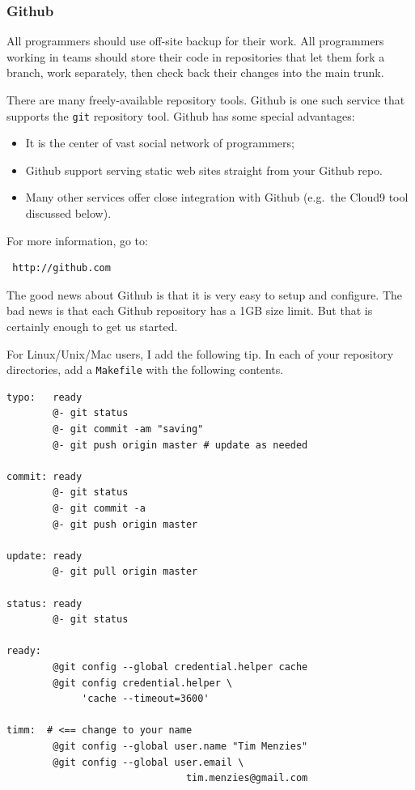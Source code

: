 \subsubsection{Github}\label{github}

All programmers should use off-site backup for their work. All
programmers working in teams should store their code in repositories
that let them fork a branch, work separately, then check back their
changes into the main trunk.

There are many freely-available repository tools. Github is one such
service that supports the \texttt{git} repository tool. Github has some
special advantages:

\begin{itemize}
\itemsep1pt\parskip0pt
\item
  It is the center of vast social network of programmers;
\item
  Github support serving static web sites straight from your Github
  repo.
\item
  Many other services offer close integration with Github (e.g.~the
  Cloud9 tool discussed below).
\end{itemize}

For more information, go to:

\begin{lstlisting}
 http://github.com
\end{lstlisting}

The good news about Github is that it is very easy to setup and
configure. The bad news is that each Github repository has a 1GB size
limit. But that is certainly enough to get us started.

For Linux/Unix/Mac users, I add the following tip. In each of your
repository directories, add a \texttt{Makefile} with the following
contents.

\begin{lstlisting}
typo:   ready
        @- git status
        @- git commit -am "saving"
        @- git push origin master # update as needed

commit: ready
        @- git status
        @- git commit -a
        @- git push origin master

update: ready
        @- git pull origin master

status: ready
        @- git status

ready:
        @git config --global credential.helper cache
        @git config credential.helper \
             'cache --timeout=3600'

timm:  # <== change to your name
        @git config --global user.name "Tim Menzies"
        @git config --global user.email \
                               tim.menzies@gmail.com
\end{lstlisting}

